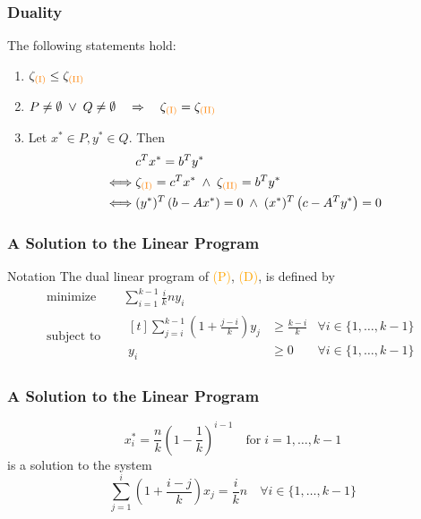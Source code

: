 \begin{frame}
    \frametitle{Duality}
    \begin{theorem}
        The following statements hold:
        \begin{enumerate}
            \item $\zeta_{\text{\textcolor{orange}{(I)}}} \leq \zeta_{\text{\textcolor{orange}{(II)}}}$
            \item $P \neq \emptyset \; \lor \; Q \neq \emptyset \quad \Rightarrow \quad \zeta_{\text{\textcolor{orange}{(I)}}} = \zeta_{\text{\textcolor{orange}{(II)}}}$
            \item \label{thm:duality} Let $x^* \in P, y^* \in Q$. Then
            \begin{align*}
                & c^T x^* = b^T y^* \\
                \iff & \zeta_{\text{\textcolor{orange}{(I)}}} = c^T x^* \; \land \; \zeta_{\text{\textcolor{orange}{(II)}}} = b^T y^* \\
                \iff & (y^*)^T \left(b - Ax^* \right) = 0 \; \land \; (x^*)^T \left(c - A^T y^* \right) = 0
            \end{align*}
        \end{enumerate}
    \end{theorem}
\end{frame}

\begin{frame}
    \frametitle{A Solution to the Linear Program}
    \begin{block}{Notation}
        The dual linear program of \textcolor{orange}{(P)}, \textcolor{orange}{(D)}, is defined by
        \begin{align*}
            \text{minimize} \quad & \sum_{i=1}^{k-1} \frac{i}{k} n y_i \\
            \text{subject to} \quad &
            \begin{aligned}[t]
                \sum_{j=i}^{k-1} \left(1 + \frac{j-i}{k} \right) y_j & \geq \frac{k-i}{k} & \forall i \in \{1, \dots, k-1 \} \\
                y_i & \geq 0 & \forall i \in \{1, \dots, k-1 \}
            \end{aligned}
        \end{align*}
    \end{block}
\end{frame}

\begin{frame}
    \frametitle{A Solution to the Linear Program}
    \begin{lemma}
        \begin{equation*}
            x_i^* = \frac{n}{k} \left(1 - \frac{1}{k} \right)^{i-1} \quad \text{for} \; i=1, \dots, k-1
        \end{equation*}
        is a solution to the system
        \begin{equation*}
            \sum_{j=1}^i \left(1 + \frac{i-j}{k} \right) x_j = \frac{i}{k} n \quad \forall i \in \{1, \dots, k-1 \}
        \end{equation*}
    \end{lemma}
\end{frame}

